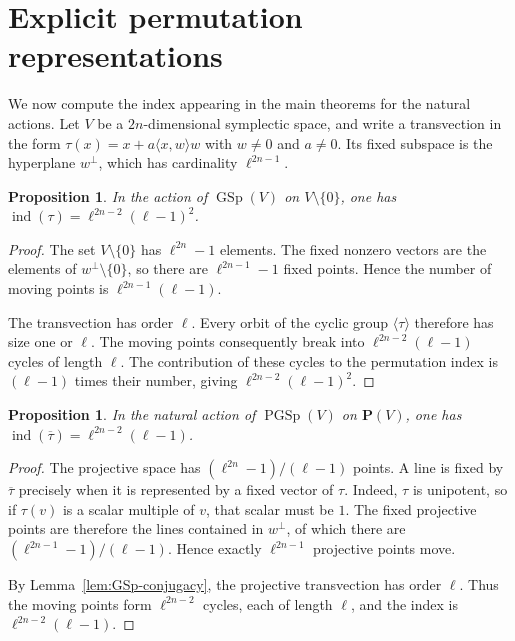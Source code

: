 \documentclass[11pt,hidelinks]{amsart}
\newtheorem{proposition}[theorem]{Proposition}
\newcommand{\GSp}{\operatorname{GSp}}
\newcommand{\PGSp}{\operatorname{PGSp}}
\newcommand{\ind}{\operatorname{ind}}
\newcommand{\PP}{\mathbf P}
\begin{document}
\section{Explicit permutation representations}\label{sec:actions}

We now compute the index appearing in the main theorems for the natural actions. Let $V$ be a $2n$-dimensional symplectic space, and write a transvection in the form
$\tau(x)=x+a\langle x,w\rangle w$ with $w\neq0$ and $a\neq0$. Its fixed subspace is the hyperplane $w^\perp$, which has cardinality $\ell^{2n-1}$.

\begin{proposition}\label{prop:vector-index}
In the action of $\GSp(V)$ on $V\setminus\{0\}$, one has $\ind(\tau)=\ell^{2n-2}(\ell-1)^2$.
\end{proposition}

\begin{proof}
The set $V\setminus\{0\}$ has $\ell^{2n}-1$ elements. The fixed nonzero vectors are the elements of $w^\perp\setminus\{0\}$, so there are $\ell^{2n-1}-1$ fixed points. Hence the number of moving points is $\ell^{2n-1}(\ell-1)$.

The transvection has order $\ell$. Every orbit of the cyclic group $\langle\tau\rangle$ therefore has size one or $\ell$. The moving points consequently break into $\ell^{2n-2}(\ell-1)$ cycles of length $\ell$. The contribution of these cycles to the permutation index is $(\ell-1)$ times their number, giving $\ell^{2n-2}(\ell-1)^2$.
\end{proof}

\begin{proposition}\label{prop:projective-index}
In the natural action of $\PGSp(V)$ on $\PP(V)$, one has $\ind(\overline\tau)=\ell^{2n-2}(\ell-1)$.
\end{proposition}

\begin{proof}
The projective space has $(\ell^{2n}-1)/(\ell-1)$ points. A line is fixed by $\overline\tau$ precisely when it is represented by a fixed vector of $\tau$. Indeed, $\tau$ is unipotent, so if $\tau(v)$ is a scalar multiple of $v$, that scalar must be $1$. The fixed projective points are therefore the lines contained in $w^\perp$, of which there are $(\ell^{2n-1}-1)/(\ell-1)$. Hence exactly $\ell^{2n-1}$ projective points move.

By Lemma~\ref{lem:GSp-conjugacy}, the projective transvection has order $\ell$. Thus the moving points form $\ell^{2n-2}$ cycles, each of length $\ell$, and the index is $\ell^{2n-2}(\ell-1)$.
\end{proof}
\end{document}
